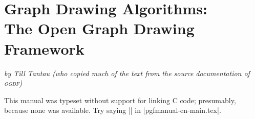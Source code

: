 %
%
%

\section[Graph Drawing Algorithms: The Open Graph Drawing Framework]{Graph Drawing Algorithms:\\ The Open Graph Drawing Framework}

{\emph{by Till Tantau (who copied much of the text from
    the source documentation of \textsc{ogdf})}}

\ifcanlinkccode
\else
This manual was typeset without support for linking C code;
presumably, because none was available. Try saying 
|\canlinkccodetrue| in |pgfmanual-en-main.tex|. 
\expandafter\endinput
\fi

This whole section is heavily under construction. It can and will
change without notice. Do not use.

\includeluadocumentationof{pgf.gd.ogdf.library}




\includeluadocumentationof{pgf.gd.doc.ogdf.layered}

\includeluadocumentationof{pgf.gd.doc.ogdf.layered.SugiyamaLayout}

\includeluadocumentationof{pgf.gd.doc.ogdf.module.RankingModule}
\includeluadocumentationof{pgf.gd.doc.ogdf.layered.CoffmanGrahamRanking}
\includeluadocumentationof{pgf.gd.doc.ogdf.layered.LongestPathRanking}
\includeluadocumentationof{pgf.gd.doc.ogdf.layered.OptimalRanking}

\includeluadocumentationof{pgf.gd.doc.ogdf.module.TwoLayerCrossMin}
\includeluadocumentationof{pgf.gd.doc.ogdf.layered.BarycenterHeuristic}
\includeluadocumentationof{pgf.gd.doc.ogdf.layered.GreedyInsertHeuristic}
\includeluadocumentationof{pgf.gd.doc.ogdf.layered.MedianHeuristic}
\includeluadocumentationof{pgf.gd.doc.ogdf.layered.SiftingHeuristic}
\includeluadocumentationof{pgf.gd.doc.ogdf.layered.SplitHeuristic}

\includeluadocumentationof{pgf.gd.doc.ogdf.module.AcyclicSubgraphModule}
\includeluadocumentationof{pgf.gd.doc.ogdf.layered.DfsAcyclicSubgraph}
\includeluadocumentationof{pgf.gd.doc.ogdf.layered.GreedyCycleRemoval}

\includeluadocumentationof{pgf.gd.doc.ogdf.module.HierarchyLayoutModule}
\includeluadocumentationof{pgf.gd.doc.ogdf.layered.FastHierarchyLayout}
\includeluadocumentationof{pgf.gd.doc.ogdf.layered.FastSimpleHierarchyLayout}




